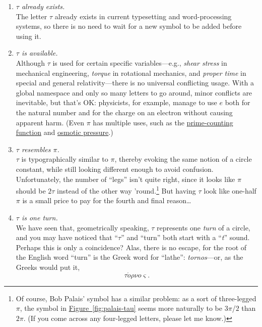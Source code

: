 \documentclass{article}
\begin{document}
\begin{enumerate}
  
  \item \emph{$\tau$ already exists.} \\ The letter $\tau$ already exists in current typesetting and word-processing systems, so there is no need to wait for a new symbol to be added before using it.
  
  \item \emph{$\tau$ is available.} \\ Although $\tau$ is used for certain specific variables---e.g., \emph{shear stress} in mechanical engineering, \emph{torque} in rotational mechanics, and \emph{proper time} in special and general relativity---there is no universal conflicting usage. With a global namespace and only so many letters to go around, minor conflicts are inevitable, but that's OK: physicists, for example, manage to use $e$ both for the natural number and for the charge on an electron without causing apparent harm. (Even $\pi$ has multiple uses, such as the \href{http://mathworld.wolfram.com/PrimeCountingFunction.html}{prime-counting function} and \href{http://www.chem.purdue.edu/gchelp/howtosolveit/Solutions/osmoticpressure.html}{osmotic pressure}.)
  
  \item \emph{$\tau$ resembles $\pi$.} \\ $\tau$ is typographically similar to $\pi$, thereby evoking the same notion of a circle constant, while still looking different enough to avoid confusion. Unfortunately, the number of ``legs'' isn't quite right, since it looks like $\pi$ should be $2\tau$ instead of the other way 'round.\footnote{Of course, Bob Palais' symbol has a similar problem: as a sort of three-legged $\pi$, the symbol in \hyperref[fig:palais-tau]{Figure~}\ref{fig:palais-tau} seems more naturally to be $3\pi$/$2$ than $2\pi$. (If you come across any four-legged letters, please let me know.)} But having $\tau$ look like one-half $\pi$ is a small price to pay for the fourth and final reason\ldots
%
  
  \item \emph{$\tau$ is one turn.} \\ We have seen that, geometrically speaking, $\tau$ represents one \emph{turn} of a circle, and you may have noticed that ``$\tau$'' and ``turn'' both start with a ``\emph{t}'' sound. Perhaps this is only a coincidence? Alas, there is no escape, for the root of the English word ``turn'' is the Greek word for ``lathe'': \emph{tornos}---or, as the Greeks would put it, \[ \tau \acute{o}\rho\nu o\varsigma. \]
  
\end{enumerate}
\end{document}
